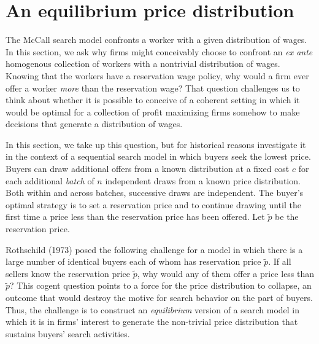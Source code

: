 \section{An equilibrium price distribution}
The McCall search model confronts a worker with a given distribution of wages.  In this section, we ask why firms might conceivably choose to confront an {\it ex ante\/} homogenous collection of  workers with a nontrivial distribution of wages.
Knowing that the workers have a reservation wage policy, why would a firm ever offer a worker {\it more\/} than the reservation wage?  That
question challenges us to think about whether it is possible to conceive of a coherent setting in which it would be optimal
for a collection of  profit maximizing firms somehow to make decisions that generate a distribution of wages.

In this section, we take up this  question, but for historical reasons investigate it in the context of a sequential search model in which buyers seek the lowest price.
%
%
Buyers  can draw additional offers from a known
distribution at a fixed cost $c$ for each  additional {\it batch}  of $n$  independent draws from a known price distribution. Both within and across  batches, successive draws are independent.  The buyer's optimal
strategy is to set a  reservation price and to continue drawing until the first time a price less than the reservation price has been offered.
Let $\tilde p$ be the reservation price.
%

Rothschild (1973)  posed the following challenge  for a model in which there is a large number of identical buyers each of whom has reservation price
$\tilde p$.  If all sellers know the reservation price $\tilde p$, why would any of them offer a price less than $\tilde p$?  This
cogent question points to a force for the price distribution to collapse, an outcome that would destroy the motive for search behavior
on the part of buyers.  Thus, the  challenge is to construct an {\it equilibrium} version of a search model  in which it is
in firms'  interest to generate  the non-trivial price
distribution that sustains buyers' search activities.

